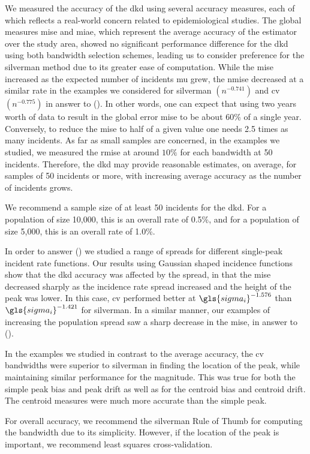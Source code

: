 We measured the accuracy of the \gls{dkd} using several accuracy measures,
each of which reflects a real-world concern related to epidemiological studies.
The global measures \gls{mise} and \gls{miae},
which represent the average accuracy of the estimator over the study area,
showed no significant performance difference
for the \gls{dkd} using both bandwidth selection schemes,
leading us to consider preference for the \gls{silverman} method due to its greater ease of computation.
While the \gls{mise} increased as the expected number of incidents \gls{mu} grew,
the \acrfull{nmise} decreased at a similar rate
in the examples we considered
for \gls{silverman} $(n^{-0.741})$ and \gls{cv} $(n^{-0.775})$ in answer to  ().
In other words,
one can expect that using two years worth of data
to result in the global error \gls{mise} to be about 60\% of a single year.
Conversely,
to reduce the \gls{mise} to half of a given value
one needs 2.5 times as many incidents.
As far as small samples are concerned,
in the examples we studied,
we measured the \acrfull{rmise} at around $10\%$ for each bandwidth at 50 incidents.
Therefore,
the \gls{dkd} may provide reasonable estimates,
on average,
for samples of 50 incidents or more,
with increasing average accuracy as the number of incidents grows.
\begin{rec}
    \label{rec:small-sample}
    We recommend a sample size of at least 50 incidents for the \gls{dkd}.
    For a population of size 10,000,
    this is an overall rate of 0.5\%,
    and for a population of size 5,000,
    this is an overall rate of 1.0\%.
\end{rec}

In order to answer  () we studied a range of spreads for different single-peak incident rate functions.
Our results using Gaussian shaped incidence functions show that the \gls{dkd} accuracy was affected by the spread,
in that the \gls{mise} decreased sharply
as the incidence rate spread increased and the height of the peak was lower.
In this case,
\gls{cv} performed better at $\gls{sigma_i}^{-1.576}$ than $\gls{sigma_i}^{-1.421}$ for \gls{silverman}.
In a similar manner,
our examples of increasing the population spread saw a sharp decrease in the \gls{mise},
in answer to  ().

In the examples we studied
in contrast to the average accuracy,
the \gls{cv} bandwidths were superior to \gls{silverman}
in finding the location of the peak,
while maintaining similar performance for the magnitude.
This was true for both the simple \gls{peak bias} and \gls{peak drift} as well as for the
\gls{centroid bias} and \gls{centroid drift}.
The centroid measures were much more accurate than the simple peak.
\begin{rec}
    \label{rec:bandwidth-scheme}
    For overall accuracy, we recommend the \gls{silverman} Rule of Thumb for computing the bandwidth due to its simplicity.
    However, if the location of the peak is important, we recommend least squares cross-validation.
\end{rec}

